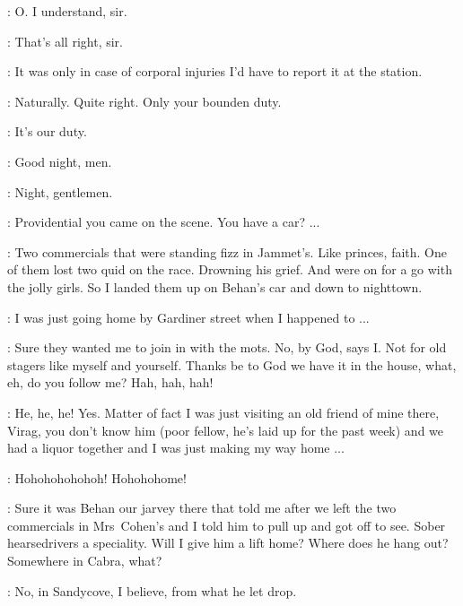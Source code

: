 \FirstWatch:
O. I understand, sir.

\SecondWatch:
That's all right, sir.

\FirstWatch:
It was only in case of corporal injuries
I'd have to report it at the station.

\Bloom:
Naturally.
Quite right.
Only your bounden duty.

\SecondWatch:
It's our duty.

\Corny:
Good night, men.

\Watch:
Night, gentlemen.


\Bloom:
Providential you came on the scene.
You have a car? ...

\Corny:
Two commercials that were standing fizz in Jammet's.
Like princes, faith.
One of them lost two quid on the race.
Drowning his grief.
And were on for a go with the jolly girls.
So I landed them up on Behan's car and down to nighttown.

\Bloom:
I was just going home by Gardiner street when I happened to ...

\Corny:
Sure they wanted me to join in with the mots.
No, by God, says I.
Not for old stagers like myself and yourself.
Thanks be to God we have it in the house, what, eh, do you follow me?
Hah, hah, hah!

\Bloom:
He, he, he!
Yes.
Matter of fact I was just visiting an old friend of mine there,
Virag, you don't know him (poor fellow, he's laid up for the past week)
and we had a liquor together and I was just making my way home ...


\Horse:
Hohohohohohoh!
Hohohohome!

\Corny:
Sure it was Behan our jarvey there that told me
after we left the two commercials in Mrs~Cohen's
and I told him to pull up and got off to see.
Sober hearsedrivers a speciality.
Will I give him a lift home?
Where does he hang out?
Somewhere in Cabra, what?

\Bloom:
No, in Sandycove, I believe, from what he let drop.


